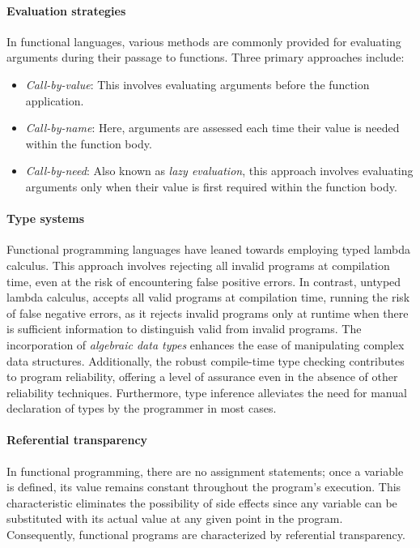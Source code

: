 \paragraph{Evaluation strategies}

In functional languages, various methods are commonly provided for evaluating arguments during their passage to functions. Three primary approaches include:

\begin{itemize}
    \item \textit{Call-by-value}: This involves evaluating arguments before the function application.
    \item \textit{Call-by-name}: Here, arguments are assessed each time their value is needed within the function body.
    \item \textit{Call-by-need}: Also known as \textit{lazy evaluation}, this approach involves evaluating arguments only when their value is first required within the function body.
\end{itemize}

\paragraph{Type systems}

Functional programming languages have leaned towards employing typed lambda calculus. This approach involves rejecting all invalid programs at compilation time, even at the risk of encountering false positive errors. In contrast, untyped lambda calculus, accepts all valid programs at compilation time, running the risk of false negative errors, as it rejects invalid programs only at runtime when there is sufficient information to distinguish valid from invalid programs. The incorporation of \textit{algebraic data types} enhances the ease of manipulating complex data structures. Additionally, the robust compile-time type checking contributes to program reliability, offering a level of assurance even in the absence of other reliability techniques. Furthermore, type inference alleviates the need for manual declaration of types by the programmer in most cases.

\paragraph{Referential transparency}

In functional programming, there are no assignment statements; once a variable is defined, its value remains constant throughout the program's execution. This characteristic eliminates the possibility of side effects since any variable can be substituted with its actual value at any given point in the program. Consequently, functional programs are characterized by referential transparency.

